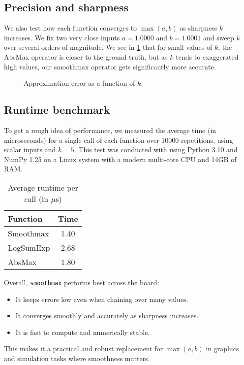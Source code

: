 \subsection*{Precision and sharpness}

We also test how each function converges to $\max(a, b)$ as sharpness $k$ increases. We fix two very close inputs $a = 1.0000$ and $b = 1.0001$ and sweep $k$ over several orders of magnitude. We see in \cref{fig:smoothmax-sharpness} that for small values of $k$, the AbsMax operator is closer to the ground truth, but as $k$ tends to exaggerated high values, our smoothmax operator gets significantly more accurate.

\begin{figure}[H]
    \centering
    \caption{Approximation error as a function of $k$.}
    \label{fig:smoothmax-sharpness}
\end{figure}

\subsection*{Runtime benchmark}

To get a rough idea of performance, we measured the average time (in microseconds) for a single call of each function over 10000 repetitions, using scalar inputs and $k = 5$. This test was conducted with using Python 3.10 and NumPy 1.25 on a Linux system with a modern multi-core CPU and 14GB of RAM. 

\begin{table}[H]
\centering
\begin{tabular}{l|c}
    \toprule
    Function & Time \\
    \midrule
    Smoothmax & 1.40 \\
    LogSumExp & 2.68 \\
    AbsMax    & 1.80 \\
    \bottomrule
\end{tabular}
\caption{Average runtime per call (in $\mu$s)}
\end{table}

\midConclusion

Overall, \texttt{smoothmax} performs best across the board:
\begin{itemize}
    \item It keeps errors low even when chaining over many values.
    \item It converges smoothly and accurately as sharpness increases.
    \item It is fast to compute and numerically stable.
\end{itemize}

This makes it a practical and robust replacement for $\max(a, b)$ in graphics and simulation tasks where smoothness matters.